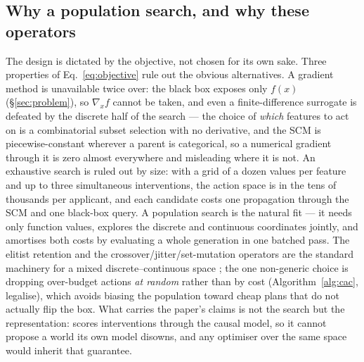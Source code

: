 \subsection{Why a population search, and why these operators}
The design is dictated by the objective, not chosen for its own sake. Three
properties of Eq.~\eqref{eq:objective} rule out the obvious alternatives. A
gradient method is unavailable twice over: the black box exposes only
$f(x)$ (\S\ref{sec:problem}), so $\nabla_x f$ cannot be taken, and even a
finite-difference surrogate is defeated by the discrete half of the search --- the
choice of \emph{which} features to act on is a combinatorial subset selection with
no derivative, and the SCM is piecewise-constant wherever a parent is categorical,
so a numerical gradient through it is zero almost everywhere and misleading where
it is not. An exhaustive search is ruled out by size: with a grid of a dozen
values per feature and up to three simultaneous interventions, the action space is
in the tens of thousands per applicant, and each candidate costs one propagation
through the SCM and one black-box query. A population search is the natural fit ---
it needs only function values, explores the discrete and continuous coordinates
jointly, and amortises both costs by evaluating a whole generation in one batched
pass. The elitist retention and the crossover/jitter/set-mutation operators are
the standard machinery for a mixed discrete--continuous space
\citep{deb2002nsga}; the one non-generic choice is dropping over-budget actions
\emph{at random} rather than by cost (Algorithm~\ref{alg:cac}, legalise), which
avoids biasing the population toward cheap plans that do not actually flip the
box. What carries the paper's claims is not the search but the representation:
\cac{} scores interventions through the causal model, so it cannot propose a world
its own model disowns, and any optimiser over the same space would inherit that
guarantee.

